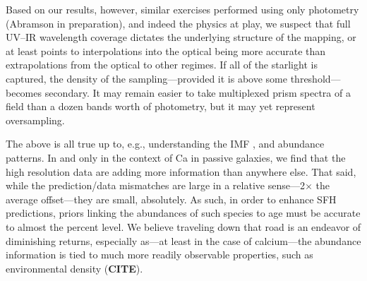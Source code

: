 \documentclass[a4paper,fleqn,usenatbib]{mnras}
\newcommand{\bfr}{\bf\color{red}}
\newcommand{\CITE}{{\bfr CITE}}
\begin{document}

Based on our results, however, similar exercises performed using only photometry 
(Abramson in preparation), and indeed the physics at play, we suspect that full UV--IR 
wavelength coverage dictates the underlying structure of the mapping, or at least points
to interpolations into the optical being more accurate than extrapolations from the optical
to other regimes. If all of the starlight is captured, the density of the sampling---provided 
it is above some threshold---becomes secondary. It may remain easier to take multiplexed 
prism spectra of a field than a dozen bands worth of photometry, but it may yet represent 
oversampling.





The above is all true up to, e.g., understanding the IMF \citep{Conroy12}, and abundance 
patterns. In and only in the context of Ca in passive galaxies, we find that the high resolution 
data are adding more information than anywhere else. That said, while the prediction/data
mismatches are large in a relative sense---2$\times$ the average offset---they are small, 
absolutely. As such, in order to enhance SFH predictions, priors linking the abundances
of such species to age must be accurate to almost the percent level. We believe traveling down
that road is an endeavor of diminishing returns, especially as---at least in the case of 
calcium---the abundance information is tied to much more readily observable properties, 
such as environmental density (\CITE).
\end{document}
